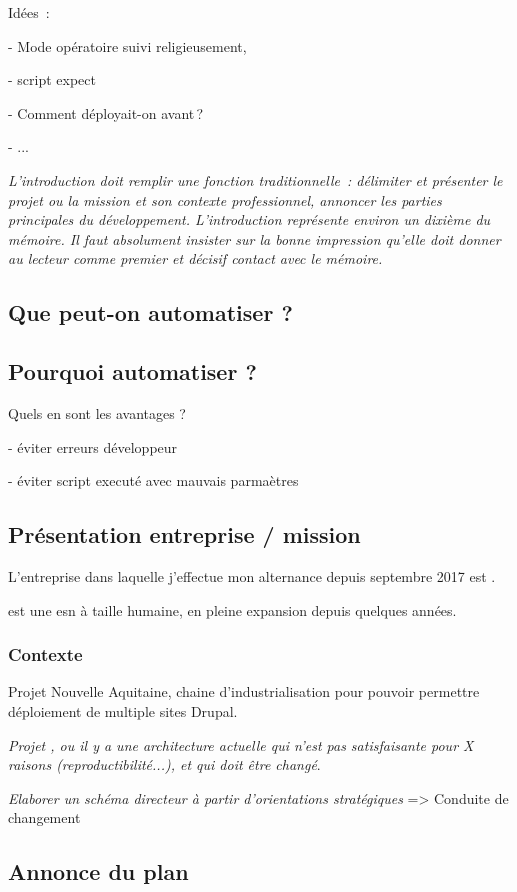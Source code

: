 Idées : 
	
- Mode opératoire suivi religieusement, 

- script expect

- Comment déployait-on avant ?

-  ...


\textit{L’introduction doit remplir une fonction traditionnelle : délimiter et présenter le projet ou la mission et son contexte professionnel, annoncer les parties principales du développement. L’introduction représente environ un dixième du mémoire. Il faut absolument insister sur la bonne impression qu’elle doit donner au lecteur comme premier et décisif contact avec le mémoire.}

\subsection{Que peut-on automatiser ?}

\subsection{Pourquoi automatiser ?}

Quels en sont les avantages ?

- éviter erreurs développeur

- éviter script executé avec mauvais parmaètres

\subsection{Présentation entreprise / mission}

L'entreprise dans laquelle j'effectue mon alternance depuis septembre 2017 est \onepoint. 

\onepoint{} est une \gls{esn} à taille humaine, en pleine expansion depuis quelques années.

\subsubsection{Contexte}

Projet Nouvelle Aquitaine, chaine d'industrialisation pour pouvoir permettre déploiement de multiple sites Drupal.

\textit{Projet \bv{}, ou il y a une architecture actuelle qui n'est pas satisfaisante pour X raisons (reproductibilité...), et qui doit être changé}.

\textit{Elaborer un schéma directeur à partir d’orientations stratégiques} => Conduite de changement


\subsection{Annonce du plan}